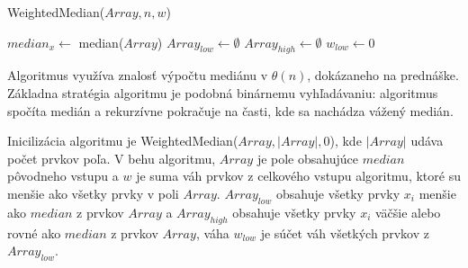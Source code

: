\documentclass[12pt]{iv003}
\begin{document}
\begin{function}[H]
	\caption{WeightedMedian($Array, n, w$)}
	
	$median_{x} \leftarrow$ median($Array$) 
	$Array_{low} \leftarrow \emptyset$ \;
	$Array_{high} \leftarrow \emptyset$ \;
	$w_{low} \leftarrow 0$ \;
	
	 {
	}
\end{function}

Algoritmus využíva znalosť výpočtu mediánu v $\theta(n)$, dokázaneho na prednáške.
Základna stratégia algoritmu je podobná binárnemu vyhľadávaniu: algoritmus spočíta
medián a rekurzívne pokračuje na časti, kde sa nachádza vážený medián.

Inicilizácia algoritmu je WeightedMedian($Array, |Array|, 0$), kde $|Array|$ udáva počet prvkov poľa. V behu algoritmu, $Array$ je pole obsahujúce $median$ pôvodneho vstupu a $w$ je suma váh prvkov z celkového vstupu algoritmu, ktoré su menšie ako všetky prvky v poli $Array$. 
$Array_{low}$ obsahuje všetky prvky $x_{i}$ menšie ako $median$ z prvkov $Array$ a $Array_{high}$ obsahuje všetky prvky $x_{i}$ väčšie alebo rovné ako $median$ z prvkov $Array$, váha $w_{low}$ je súčet váh všetkých prvkov z $Array_{low}$.
\end{document}
